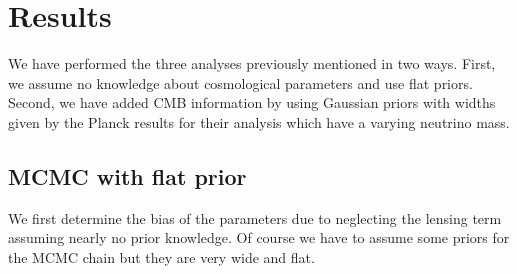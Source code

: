 \section{Results}
\label{chapter-mnu:results}

We have performed the three analyses previously mentioned in two ways. First, we assume no knowledge about cosmological parameters and use flat priors. Second, we have added CMB information by using Gaussian priors with widths given by the Planck results for their analysis which have a varying neutrino mass. 

\subsection{MCMC with flat prior}

We first determine the bias of the parameters due to neglecting the lensing term assuming nearly no prior knowledge. Of course we have to assume some priors for the MCMC chain but they are very wide and flat.
